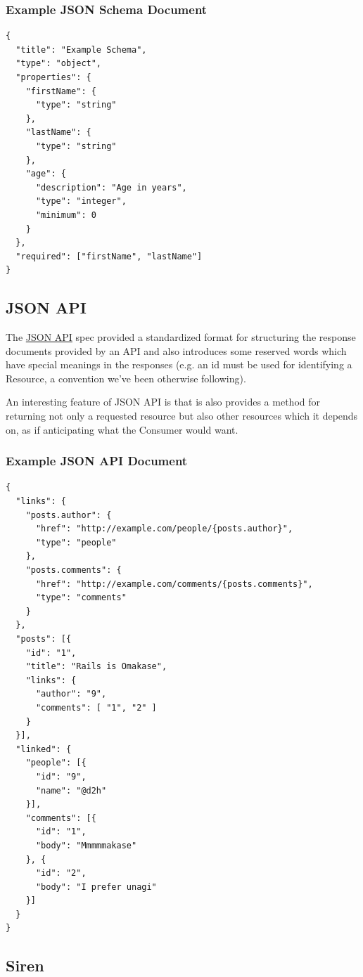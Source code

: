 \documentclass{book}
\begin{document}
\subsubsection{Example JSON Schema Document}

\begin{verbatim}
{
  "title": "Example Schema",
  "type": "object",
  "properties": {
    "firstName": {
      "type": "string"
    },
    "lastName": {
      "type": "string"
    },
    "age": {
      "description": "Age in years",
      "type": "integer",
      "minimum": 0
    }
  },
  "required": ["firstName", "lastName"]
}
\end{verbatim}

\subsection{JSON API}

The \href{http://jsonapi.org/}{JSON API} spec provided a standardized format for structuring the response documents provided by an API and also introduces some reserved words which have special meanings in the responses (e.g. an id must be used for identifying a Resource, a convention we've been otherwise following).

An interesting feature of JSON API is that is also provides a method for returning not only a requested resource but also other resources which it depends on, as if anticipating what the Consumer would want.

\subsubsection{Example JSON API Document}

\begin{verbatim}
{
  "links": {
    "posts.author": {
      "href": "http://example.com/people/{posts.author}",
      "type": "people"
    },
    "posts.comments": {
      "href": "http://example.com/comments/{posts.comments}",
      "type": "comments"
    }
  },
  "posts": [{
    "id": "1",
    "title": "Rails is Omakase",
    "links": {
      "author": "9",
      "comments": [ "1", "2" ]
    }
  }],
  "linked": {
    "people": [{
      "id": "9",
      "name": "@d2h"
    }],
    "comments": [{
      "id": "1",
      "body": "Mmmmmakase"
    }, {
      "id": "2",
      "body": "I prefer unagi"
    }]
  }
}
\end{verbatim}

\subsection{Siren}
\end{document}
